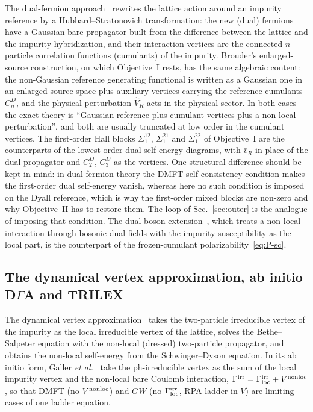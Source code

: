 \documentclass[11pt,a4paper]{article}
\newcommand{\GW}{$GW$}
\newcommand{\loc}{\mathrm{loc}}
\newcommand{\DGA}{D$\Gamma$A}
\begin{document}
The dual-fermion approach~\cite{Rubtsov2008} rewrites the lattice action
around an impurity reference by a Hubbard--Stratonovich transformation: the
new (dual) fermions have a Gaussian bare propagator built from the
difference between the lattice and the impurity hybridization, and their
interaction vertices are the connected $n$-particle correlation functions
(cumulants) of the impurity.  Brouder's enlarged-source construction, on
which Objective~I rests, has the same algebraic content: the non-Gaussian
reference generating functional is written as a Gaussian one in an enlarged
source space plus auxiliary vertices carrying the reference cumulants
$C_n^D$, and the physical perturbation $\hat V_R$ acts in the physical
sector.  In both cases the exact theory is ``Gaussian reference plus cumulant
vertices plus a non-local perturbation'', and both are usually truncated at
low order in the cumulant vertices.  The first-order Hall blocks
$\Sigma^{12}_1$, $\Sigma^{21}_1$ and $\Sigma^{22}_1$ of Objective~I are the
counterparts of the lowest-order dual self-energy diagrams, with $\bar v_R$
in place of the dual propagator and $C_2^D$, $C_3^D$ as the vertices.  One
structural difference should be kept in mind: in dual-fermion theory the
DMFT self-consistency condition makes the first-order dual self-energy
vanish, whereas here no such condition is imposed on the Dyall reference,
which is why the first-order mixed blocks are non-zero and why Objective~II
has to restore them.  The loop of Sec.~\ref{sec:outer} is the analogue of
imposing that condition.  The dual-boson extension~\cite{RubtsovDB2012},
which treats a non-local interaction through bosonic dual fields with the
impurity susceptibility as the local part, is the counterpart of the
frozen-cumulant polarizability~\eqref{eq:P-sc}.

\subsection{The dynamical vertex approximation, ab initio \DGA{} and TRILEX}

The dynamical vertex approximation~\cite{Toschi2007,Rohringer2018} takes the
two-particle irreducible vertex of the impurity as the local irreducible
vertex of the lattice, solves the Bethe--Salpeter equation with the
non-local (dressed) two-particle propagator, and obtains the non-local
self-energy from the Schwinger--Dyson equation.  In its ab initio form,
Galler \emph{et al.}~\cite{Galler2017} take the ph-irreducible vertex as the
sum of the local impurity vertex and the non-local bare Coulomb interaction,
$\Gamma^{\rm irr}=\Gamma^{\rm irr}_{\loc}+V^{\rm nonloc}$, so that DMFT (no
$V^{\rm nonloc}$) and \GW{} (no $\Gamma^{\rm irr}_{\loc}$, RPA ladder in $V$)
are limiting cases of one ladder equation.
\end{document}
